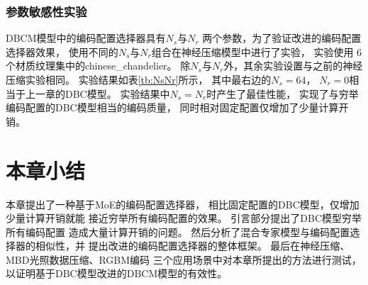 \begin{table*}[htbp]
    \centering
    \caption{6个材质的纹理集上进行的性能实验}
    \label{4:6个材质的纹理集上进行的性能实验}        
\end{table*}

\subsubsection{参数敏感性实验}

DBCM模型中的编码配置选择器具有$N_s$与$N_r$
两个参数，为了验证改进的编码配置选择器效果，
使用不同的$N_s$与$N_r$组合在神经压缩模型中进行了实验，
实验使用 6 个材质纹理集中的chinese\_chandelier。
除$N_s$与$N_r$外，其余实验设置与之前的神经压缩实验相同。
实验结果如表\ref{tb:NsNr}所示，
其中最右边的$N_s=64$， $N_r=0$相当于上一章的DBC模型。
实验结果中$N_s=N_r$时产生了最佳性能，
实现了与穷举编码配置的DBC模型相当的编码质量，
同时相对固定配置仅增加了少量计算开销。

\begin{table*}[htbp]
    \centering
    \caption{ $N_s$与$N_r$的参数敏感性实验结果}
    \label{tb:NsNr}
\end{table*}

\section{本章小结}

本章提出了一种基于MoE的编码配置选择器，
相比固定配置的DBC模型，仅增加少量计算开销就能
接近穷举所有编码配置的效果。
引言部分提出了DBC模型穷举所有编码配置
造成大量计算开销的问题。
然后分析了混合专家模型与编码配置选择器的相似性，并
提出改进的编码配置选择器的整体框架。
最后在神经压缩、MBD光照数据压缩、RGBM编码
三个应用场景中对本章所提出的方法进行测试，
以证明基于DBC模型改进的DBCM模型的有效性。
